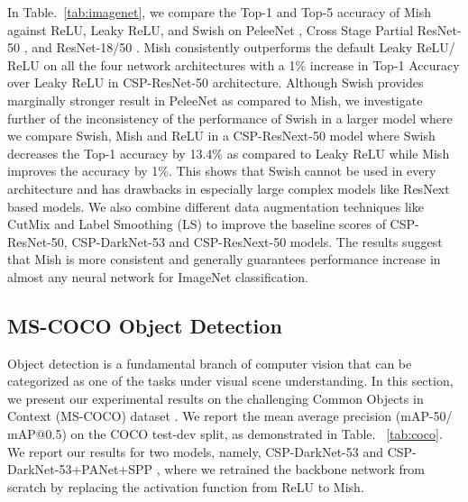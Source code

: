 \documentclass{bmvc2k}
\begin{document}
In Table.~\ref{tab:imagenet}, we compare the Top-1 and Top-5 accuracy of Mish against ReLU, Leaky ReLU, and Swish on PeleeNet \cite{wang2018pelee} , Cross Stage Partial ResNet-50 \cite{wang2019cspnet}, and ResNet-18/50 \cite{he2016deep}. Mish consistently outperforms the default Leaky ReLU/ ReLU on all the four network architectures with a 1$\%$ increase in Top-1 Accuracy over Leaky ReLU in CSP-ResNet-50 architecture. Although Swish provides marginally stronger result in PeleeNet as compared to Mish, we investigate further of the inconsistency of the performance of Swish in a larger model where we compare Swish, Mish and ReLU in a CSP-ResNext-50 model \cite{wang2019cspnet, xie2017aggregated} where Swish decreases the Top-1 accuracy by 13.4$\%$ as compared to Leaky ReLU while Mish improves the accuracy by 1$\%$. This shows that Swish cannot be used in every architecture and has drawbacks in especially large complex models like ResNext based models. We also combine different data augmentation techniques like CutMix \cite{yun2019cutmix} and Label Smoothing (LS) \cite{muller2019does} to improve the baseline scores of CSP-ResNet-50, CSP-DarkNet-53 \cite{bochkovskiy2020yolov4} and CSP-ResNext-50 models. The results suggest that Mish is more consistent and generally guarantees performance increase in almost any neural network for ImageNet classification. 


\subsection{MS-COCO Object Detection}

Object detection \cite{girshick2014rich} is a fundamental branch of computer vision that can be categorized as one of the tasks under visual scene understanding. In this section, we present our experimental results on the challenging Common Objects in Context (MS-COCO) dataset \cite{lin2014microsoft}. We report the mean average precision (mAP-50/ mAP@0.5) on the COCO test-dev split, as demonstrated in Table. ~\ref{tab:coco}. We report our results for two models, namely, CSP-DarkNet-53 \cite{bochkovskiy2020yolov4} and CSP-DarkNet-53+PANet+SPP \cite{bochkovskiy2020yolov4, he2015spatial}, where we retrained the backbone network from scratch by replacing the activation function from ReLU to Mish. 
\end{document}
